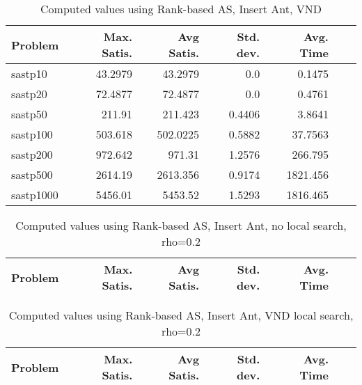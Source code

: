 \documentclass{article}
\begin{document}
\begin{table}[b!]
  \caption{Computed values using Rank-based AS, Insert Ant, VND}
  \label{tab:conf9}
  \setlength{\tabcolsep}{1.4mm}
  \centering
  \begin{tabular}{lrrrrrr}
    \bfseries Problem &
    \bfseries Max. Satis. &
    \bfseries Avg Satis. &
    \bfseries Std. dev. &
    \bfseries Avg. Time 
    \\\hline
    sastp10 & 43.2979 & 43.2979 & 0.0 & 0.1475 \\ 
    sastp20 & 72.4877 & 72.4877 & 0.0 & 0.4761 \\ 
    sastp50 & 211.91 & 211.423 & 0.4406 & 3.8641 \\ 
    sastp100 & 503.618 & 502.0225 & 0.5882 & 37.7563 \\ 
    sastp200 & 972.642 & 971.31 & 1.2576 & 266.795 \\ 
    sastp500 & 2614.19 & 2613.356 & 0.9174 & 1821.456 \\ 
    sastp1000 & 5456.01 & 5453.52 & 1.5293 & 1816.465
    \\\hline
  \end{tabular}

\end{table}



\begin{table}
  \caption{Computed values using Rank-based AS, Insert Ant, no local search, rho=0.2}
  \label{tab:conf10}
  \setlength{\tabcolsep}{1.4mm}
  \centering
  \begin{tabular}{lrrrrrr}
    \bfseries Problem &
    \bfseries Max. Satis. &
    \bfseries Avg Satis. &
    \bfseries Std. dev. &
    \bfseries Avg. Time 
    \\\hline
    
    \hline
  \end{tabular}

\end{table}


\begin{table}
  \caption{Computed values using Rank-based AS, Insert Ant, VND local search, rho=0.2}
  \label{tab:conf11}
  \setlength{\tabcolsep}{1.4mm}
  \centering
  \begin{tabular}{lrrrrrr}
    \bfseries Problem &
    \bfseries Max. Satis. &
    \bfseries Avg Satis. &
    \bfseries Std. dev. &
    \bfseries Avg. Time 
    \\\hline
    
    \hline
  \end{tabular}

\end{table}
\end{document}
